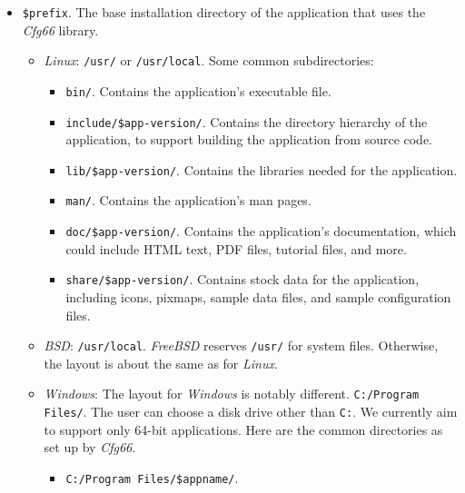    \begin{itemize}
      \item \texttt{\$prefix}.
         The base installation directory of the application that uses the
         \textsl{Cfg66} library.
         \begin{itemize}
            \item \textsl{Linux}:
               \texttt{/usr/} or \texttt{/usr/local}.
               Some common subdirectories:
               \begin{itemize}
                  \item \texttt{bin/}. 
                     Contains the application's executable file.
                  \item \texttt{include/\$app-version/}.
                     Contains the directory hierarchy of the application,
                     to support building the application from source code.
                  \item \texttt{lib/\$app-version/}.
                     Contains the libraries needed for the application.
                  \item \texttt{man/}. 
                     Contains the application's man pages.
                  \item \texttt{doc/\$app-version/}. 
                     Contains the application's documentation, which could
                     include HTML text, PDF files, tutorial files, and more.
                  \item \texttt{share/\$app-version/}. 
                     Contains stock data for the application, including
                     icons, pixmaps, sample data files, and sample
                     configuration files.
               \end{itemize}
            \item \textsl{BSD}:
               \texttt{/usr/local}.
                  \textsl{FreeBSD} reserves \texttt{/usr/} for system
                  files. Otherwise, the layout is about the same as for
                  \textsl{Linux}.
            \item \textsl{Windows}:
               The layout for \textsl{Windows} is notably different.
               \texttt{C:/Program Files/}. 
               The user can choose a disk drive other than \texttt{C:}.
               We currently aim to support only 64-bit applications.
               Here are the common directories as set up by \textsl{Cfg66}.
               \begin{itemize}
                  \item \texttt{C:/Program Files/\$appname/}. 

\end{itemize}
\end{itemize}
\end{itemize}

